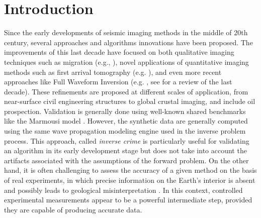 \documentclass[paper,extra]{gji} %
\begin{document}
\modulolinenumbers[5]
\linenumbers

\section{Introduction}


\noindent Since the early developments of seismic imaging methods in the middle of 20th century, several approaches and algorithms innovations have been proposed. The improvements of this last decade have focused on both qualitative imaging techniques such as migration (e.g., \citet{Berkhout_MSS_2012,Guofeng_GPU_2013}), novel applications of quantitative imaging methods such as first arrival tomography (e.g. \citet{Bohm_CWS_2015}), and even more recent approaches like Full Waveform Inversion (e.g. \citet{Perez_AWI_2014}, see \citet{Virieux_FWI_2009} for a review of the last decade). These refinements are proposed at different scales of application, from near-surface civil engineering structures to global crustal imaging, and include oil prospection. Validation is generally done using well-known shared benchmarks like the Marmousi model \citep{martin2006marmousi2}. However, the synthetic data are generally computed using the same wave propagation modeling engine used in the inverse problem process. This approach, called \textit{inverse crime} \citep{Wirgin_TIC_2004} is particularly useful for validating an algorithm in its early development stage but does not take into account the artifacts associated with the assumptions of the forward problem. On the other hand, it is often challenging to assess the accuracy of a given method on the basis of real experiments, in which precise information on the Earth's interior is absent and possibly leads to geological misinterpretation \citep{Morozov_ARF_2004}. In this context, controlled experimental measurements appear to be a powerful intermediate step, provided they are capable of producing accurate data.
\end{document}
